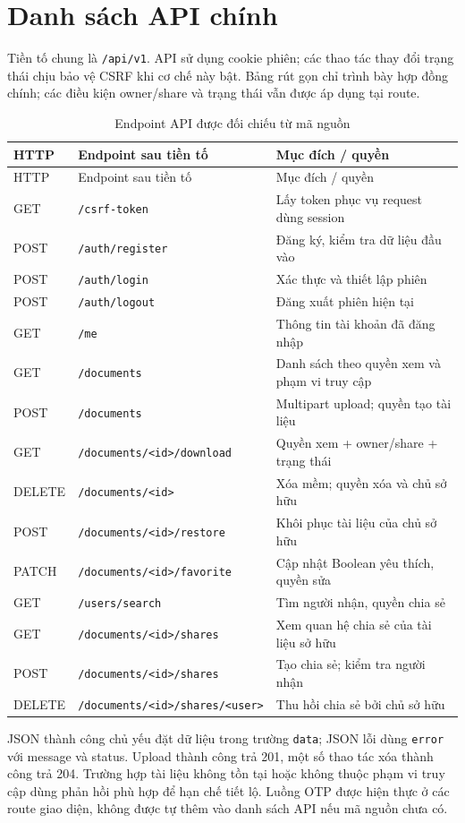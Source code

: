 \chapter{Danh sách API chính}
Tiền tố chung là \nolinkurl{/api/v1}. API sử dụng cookie phiên; các thao tác thay đổi trạng thái chịu bảo vệ CSRF khi cơ chế này bật. Bảng rút gọn chỉ trình bày hợp đồng chính; các điều kiện owner/share và trạng thái vẫn được áp dụng tại route.
{\small\begin{longtable}{P{1.8cm}P{5.7cm}P{5.2cm}}
\caption{Endpoint API được đối chiếu từ mã nguồn}\\\toprule
\textbf{HTTP}&\textbf{Endpoint sau tiền tố}&\textbf{Mục đích / quyền}\\\midrule\endfirsthead
\toprule HTTP&Endpoint sau tiền tố&Mục đích / quyền\\\midrule\endhead
GET & \nolinkurl{/csrf-token} & Lấy token phục vụ request dùng session\\
POST & \nolinkurl{/auth/register} & Đăng ký, kiểm tra dữ liệu đầu vào\\
POST & \nolinkurl{/auth/login} & Xác thực và thiết lập phiên\\
POST & \nolinkurl{/auth/logout} & Đăng xuất phiên hiện tại\\
GET & \nolinkurl{/me} & Thông tin tài khoản đã đăng nhập\\
GET & \nolinkurl{/documents} & Danh sách theo quyền xem và phạm vi truy cập\\
POST & \nolinkurl{/documents} & Multipart upload; quyền tạo tài liệu\\
GET & \nolinkurl{/documents/<id>/download} & Quyền xem + owner/share + trạng thái\\
DELETE & \nolinkurl{/documents/<id>} & Xóa mềm; quyền xóa và chủ sở hữu\\
POST & \texttt{/documents/<id>/}\newline\texttt{restore} & Khôi phục tài liệu của chủ sở hữu\\
PATCH & \nolinkurl{/documents/<id>/favorite} & Cập nhật Boolean yêu thích, quyền sửa\\
GET & \nolinkurl{/users/search} & Tìm người nhận, quyền chia sẻ\\
GET & \nolinkurl{/documents/<id>/shares} & Xem quan hệ chia sẻ của tài liệu sở hữu\\
POST & \nolinkurl{/documents/<id>/shares} & Tạo chia sẻ; kiểm tra người nhận\\
DELETE & \texttt{/documents/<id>/}\newline\texttt{shares/<user>} & Thu hồi chia sẻ bởi chủ sở hữu\\\bottomrule
\end{longtable}}
JSON thành công chủ yếu đặt dữ liệu trong trường \texttt{data}; JSON lỗi dùng \texttt{error} với message và status. Upload thành công trả 201, một số thao tác xóa thành công trả 204. Trường hợp tài liệu không tồn tại hoặc không thuộc phạm vi truy cập dùng phản hồi phù hợp để hạn chế tiết lộ. Luồng OTP được hiện thực ở các route giao diện, không được tự thêm vào danh sách API nếu mã nguồn chưa có.

